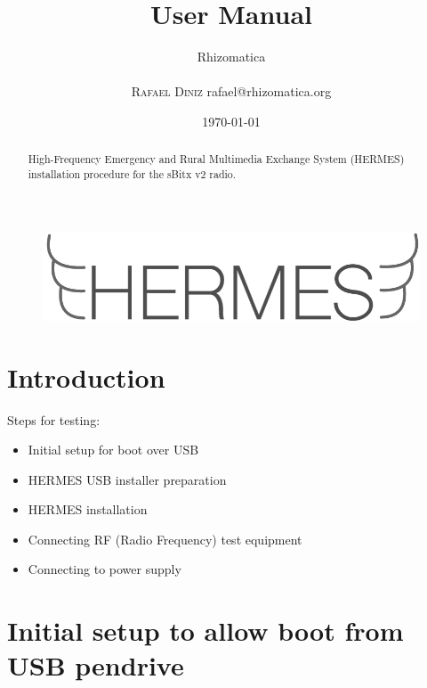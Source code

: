 \documentclass[11pt,a4paper]{article}
\title{User Manual}
\author{
       \large
       \mbox{Rhizomatica} \\
       \mbox{}\\ 
       \textsc{Rafael Diniz}
        rafael@rhizomatica.org\\
}
\date{\today}
\begin{document}
\maketitle

\begin{figure}[!ht]
\includegraphics[width=1\textwidth]{pictures/logoh.png}
\end{figure}

\begin{abstract}

  High-Frequency Emergency and Rural Multimedia Exchange System (HERMES) installation procedure for the sBitx v2 radio.

\end{abstract}


\tableofcontents

\setlength{\parindent}{0em}
\setlength{\parskip}{1em}

\section{Introduction}

Steps for testing:

\begin{itemize}
\item Initial setup for boot over USB
\item HERMES USB installer preparation
\item HERMES installation
\item Connecting RF (Radio Frequency) test equipment
\item Connecting to power supply
\end{itemize}


\section{Initial setup to allow boot from USB pendrive}
\end{document}
